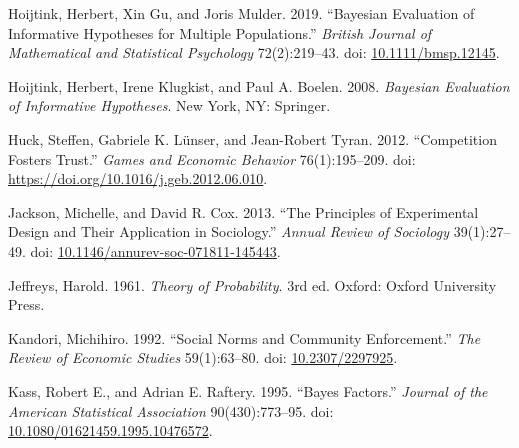 \documentclass[
  11pt,
]{article}
\newlength{\cslhangindent}
\newlength{\cslentryspacingunit} %
\newenvironment{CSLReferences}[2] %
 {%
  \setlength{\parindent}{0pt}
  \ifodd #1
  \let\oldpar\par
  \def\par{\hangindent=\cslhangindent\oldpar}
  \fi
  \setlength{\parskip}{#2\cslentryspacingunit}
 }%
 {}
\begin{document}
\begin{CSLReferences}{1}{0}
\leavevmode{}%
Hoijtink, Herbert, Xin Gu, and Joris Mulder. 2019. {``Bayesian Evaluation of Informative Hypotheses for Multiple Populations.''} \emph{British Journal of Mathematical and Statistical Psychology} 72(2):219--43. doi: \href{https://doi.org/10.1111/bmsp.12145}{10.1111/bmsp.12145}.

\leavevmode{}%
Hoijtink, Herbert, Irene Klugkist, and Paul A. Boelen. 2008. \emph{Bayesian Evaluation of Informative Hypotheses}. New York, NY: Springer.

\leavevmode{}%
Huck, Steffen, Gabriele K. Lünser, and Jean-Robert Tyran. 2012. {``Competition Fosters Trust.''} \emph{Games and Economic Behavior} 76(1):195--209. doi: \url{https://doi.org/10.1016/j.geb.2012.06.010}.

\leavevmode{}%
Jackson, Michelle, and David R. Cox. 2013. {``The Principles of Experimental Design and Their Application in Sociology.''} \emph{Annual Review of Sociology} 39(1):27--49. doi: \href{https://doi.org/10.1146/annurev-soc-071811-145443}{10.1146/annurev-soc-071811-145443}.

\leavevmode{}%
Jeffreys, Harold. 1961. \emph{{Theory of {P}robability}}. 3rd ed. Oxford: Oxford University Press.

\leavevmode{}%
Kandori, Michihiro. 1992. {``{Social Norms and Community Enforcement}.''} \emph{The Review of Economic Studies} 59(1):63--80. doi: \href{https://doi.org/10.2307/2297925}{10.2307/2297925}.

\leavevmode{}%
Kass, Robert E., and Adrian E. Raftery. 1995. {``Bayes Factors.''} \emph{Journal of the American Statistical Association} 90(430):773--95. doi: \href{https://doi.org/10.1080/01621459.1995.10476572}{10.1080/01621459.1995.10476572}.


\end{CSLReferences}
\end{document}
